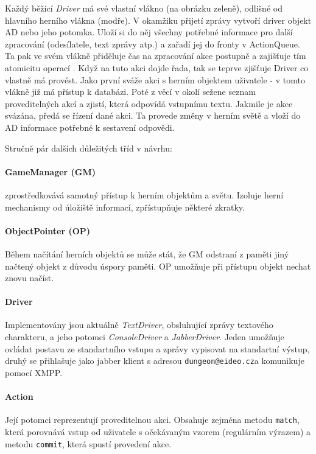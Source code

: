 \documentclass[11pt, a4paper]{article}
\makeatletter
\def\class#1{\emph{#1}}
\def\jid{\texttt{dungeon@eideo.cz}}
\makeatother
\begin{document}
Každý běžící \class{Driver} má své vlastní vlákno (na obrázku zeleně), odlišné od hlavního herního vlákna (modře). V okamžiku přijetí zprávy vytvoří driver objekt AD nebo jeho potomka. Uloží si do něj všechny potřebné informace pro další zpracování (odesílatele, text zprávy atp.) a  zařadí jej do fronty v ActionQueue. Ta pak ve svém vlákně přiděluje čas na zpracování akce postupně a zajišťuje tím atomicitu operací . Když na tuto akci dojde řada, tak se teprve zjišťuje Driver co vlastně má provést. Jako první sváže akci s herním objektem uživatele - v tomto vlákně již má přístup k databázi. Poté z věcí v okolí sežene seznam proveditelných akcí a zjistí, která odpovídá vstupnímu textu. Jakmile je akce svázána, předá se řízení dané akci. Ta provede změny v herním světě a vloží do AD informace potřebné k sestavení odpovědi.

Stručně pár dalších důležitých tříd v návrhu:

\paragraph{GameManager (GM)} zprostředkovává samotný přístup k herním objektům a světu. Izoluje herní mechanismy od úložiště informací, zpřístupňuje některé zkratky.

\paragraph{ObjectPointer (OP)} Během načítání herních objektů se může stát, že GM odstraní z paměti jiný načtený objekt z důvodu úspory paměti. OP umožňuje při přístupu objekt nechat znovu načíst.

\paragraph{Driver} Implementovány jsou aktuálně \class{TextDriver}, obsluhující zprávy textového charakteru, a jeho potomci \class{ConsoleDriver} a \class{JabberDriver}. Jeden umožňuje ovládat postavu ze standartního vstupu a zprávy vypisovat na standartní výstup, druhý se přihlašuje jako jabber klient s adresou \jid a komunikuje pomocí XMPP.

\paragraph{Action} Její potomci reprezentují proveditelnou akci. Obsahuje zejména metodu \texttt{match}, která porovnává vstup od uživatele s očekávaným vzorem (regulárním výrazem) a metodu \texttt{commit}, která spustí provedení akce.
\end{document}
